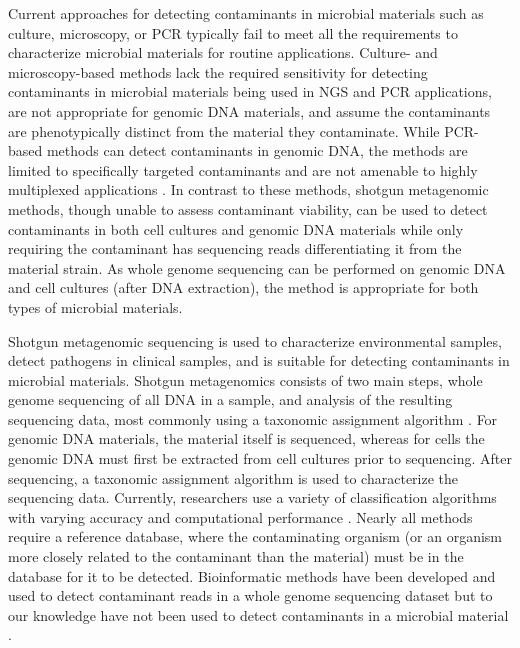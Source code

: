 \documentclass[fleqn,10pt,lineno]{wlpeerj}\usepackage[]{graphicx}\usepackage[]{color}
\begin{document}
Current approaches for detecting contaminants in microbial materials such as culture, microscopy, or PCR typically fail to meet all the requirements to characterize microbial materials for routine applications. 
Culture- and microscopy-based methods lack the required sensitivity for detecting contaminants in microbial materials being used in NGS and PCR applications, are not appropriate for genomic DNA materials, and assume the contaminants are phenotypically distinct from the material they contaminate. 
While PCR-based methods can detect contaminants in genomic DNA, the methods are limited to specifically targeted contaminants and are not amenable to highly multiplexed applications \citep{heck2016evaluating,Marron2013}. 
In contrast to these methods, shotgun metagenomic methods, though unable to assess contaminant viability, can be used to detect contaminants in both cell cultures and genomic DNA materials while only requiring the contaminant has sequencing reads differentiating it from the material strain. 
As whole genome sequencing can be performed on genomic DNA and cell cultures (after DNA extraction), the method is appropriate for both types of microbial materials.  

Shotgun metagenomic sequencing is used to characterize environmental samples, detect pathogens in clinical samples, and is suitable for detecting contaminants in microbial materials.
Shotgun metagenomics consists of two main steps, whole genome sequencing of all DNA in a sample, and analysis of the resulting sequencing data, most commonly using a taxonomic assignment algorithm \citep{Thomas2012}.
For genomic DNA materials, the material itself is sequenced, whereas for cells the genomic DNA must first be extracted from cell cultures prior to sequencing.
After sequencing, a taxonomic assignment algorithm is used to characterize the sequencing data.
Currently, researchers use a variety of classification algorithms with varying accuracy and computational performance \citep{Bazinet2012,menzel2016fast,sczyrba2017critical}.
Nearly all methods require a reference database, where the contaminating organism (or an organism more closely related to the contaminant than the material) must be in the database for it to be detected. 
Bioinformatic methods have been developed and used to detect contaminant reads in a whole genome sequencing dataset but to our knowledge have not been used to detect contaminants in a microbial material \citep{kumar2013blobology,delmont2016identifying}. 
\end{document}
